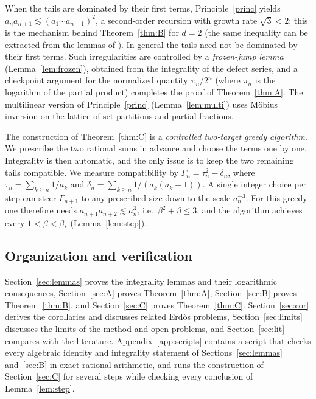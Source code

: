 \documentclass[11pt]{amsart}
\theoremstyle{definition}
\theoremstyle{remark}
\begin{document}
When the tails are dominated by their first terms, Principle~\ref{princ} yields
$a_na_{n+1}\lesssim(a_1\cdots a_{n-1})^2$, a second-order recursion with growth rate
$\sqrt3<2$; this is the mechanism behind Theorem~\ref{thm:B} for $d=2$ (the same
inequality can be extracted from the lemmas of \cite{Kit26}). In general the
tails need not be dominated by their first terms. Such irregularities are controlled by a
\emph{frozen-jump lemma} (Lemma~\ref{lem:frozen}), obtained from the integrality of the
defect series, and a checkpoint argument for the normalized quantity $\pi_n/2^n$ (where
$\pi_n$ is the logarithm of the partial product) completes the proof of
Theorem~\ref{thm:A}. The multilinear version of Principle~\ref{princ}
(Lemma~\ref{lem:multi}) uses M\"obius inversion on the lattice of set partitions and
partial fractions.

The construction of Theorem~\ref{thm:C} is a \emph{controlled two-target greedy
algorithm}. We prescribe the two rational sums in advance and choose the terms one by
one. Integrality is then automatic, and the only issue is to keep the two remaining
tails compatible. We measure compatibility by $\Gamma_n=\tau_n^2-\delta_n$, where
$\tau_n=\sum_{k\ge n}1/a_k$ and $\delta_n=\sum_{k\ge n}1/(a_k(a_k-1))$. A single integer
choice per step can steer $\Gamma_{n+1}$ to any prescribed size down to the scale
$a_n^{-3}$. For this greedy one therefore needs $a_{n+1}a_{n+2}\lesssim a_n^3$, i.e.\
$\beta^2+\beta\le3$, and the algorithm achieves every $1<\beta<\beta_*$
(Lemma~\ref{lem:step}).

\subsection{Organization and verification}
Section~\ref{sec:lemmas} proves the integrality lemmas and their logarithmic
consequences, Section~\ref{sec:A} proves Theorem~\ref{thm:A}, Section~\ref{sec:B}
proves Theorem~\ref{thm:B}, and Section~\ref{sec:C} proves Theorem~\ref{thm:C}.
Section~\ref{sec:cor} derives the corollaries and discusses related Erd\H{o}s problems,
Section~\ref{sec:limits} discusses the limits of the method and open problems, and
Section~\ref{sec:lit} compares with the literature. Appendix~\ref{app:scripts} contains
a script that checks every algebraic identity and integrality statement of
Sections~\ref{sec:lemmas} and~\ref{sec:B} in exact rational arithmetic, and runs the
construction of Section~\ref{sec:C} for several steps while checking every conclusion of
Lemma~\ref{lem:step}.
\end{document}
